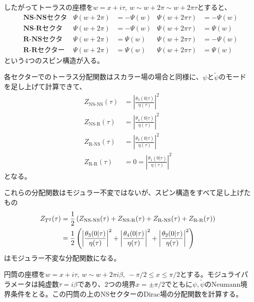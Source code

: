 したがってトーラスの座標を$w=x+i\tau,\ w\sim w+2\pi\sim w+2\pi\tau$とすると、
\begin{align}
&&&\textbf{NS-NSセクター}&\Psi(w+2\pi)&=-\Psi(w)&\Psi(w+2\pi\tau)&=-\Psi(w)&&\\
&&&\textbf{NS-Rセクター}&\Psi(w+2\pi)&=-\Psi(w)&\Psi(w+2\pi\tau)&=\Psi(w)&&\\
&&&\textbf{R-NSセクター}&\Psi(w+2\pi)&=\Psi(w)&\Psi(w+2\pi\tau)&=-\Psi(w)&&\\
&&&\textbf{R-Rセクター}&\Psi(w+2\pi)&=\Psi(w)&\Psi(w+2\pi\tau)&=\Psi(w)&&
\end{align}
という$4$つのスピン構造が入る。

各セクターでのトーラス分配関数はスカラー場の場合と同様に、$\psi$と$\tilde{\psi}$のモードを足し上げて計算できて、
\begin{align}
Z_\text{NS-NS}(\tau)&=\left| \frac{\theta_3(0|\tau)}{\eta(\tau)} \right|^2\\
Z_\text{NS-R}(\tau)&=\left| \frac{\theta_4(0|\tau)}{\eta(\tau)} \right|^2\\
Z_\text{R-NS}(\tau)&=\left| \frac{\theta_2(0|\tau)}{\eta(\tau)} \right|^2\\
Z_\text{R-R}(\tau)&=0=\left| \frac{\theta_1(0|\tau)}{\eta(\tau)} \right|^2
\end{align}
となる。

これらの分配関数はモジュラー不変ではないが、スピン構造をすべて足し上げたもの
\begin{align}
Z_{T^2}(\tau)&=\frac{1}{2}\left(Z_\text{NS-NS}(\tau)+Z_\text{NS-R}(\tau)+Z_\text{R-NS}(\tau)+Z_\text{R-R}(\tau)\right)\notag\\
&=\frac{1}{2}\left( \left| \frac{\theta_3(0|\tau)}{\eta(\tau)} \right|^2+\left| \frac{\theta_4(0|\tau)}{\eta(\tau)} \right|^2+\left| \frac{\theta_2(0|\tau)}{\eta(\tau)} \right|^2 \right)
\end{align}
はモジュラー不変な分配関数になる。

円筒の座標を$w=x+i\tau,\  w\sim w+2\pi i\beta,\  -\pi/2\leq x \leq \pi/2$とする。モジュライパラメータは純虚数$\tau=i\beta$であり、$2$つの境界$x=\pm \pi/2$でともに$\psi,\tilde{\psi}$のNeumann境界条件をとる。この円筒の上のNSセクターのDirac場の分配関数を計算する。

